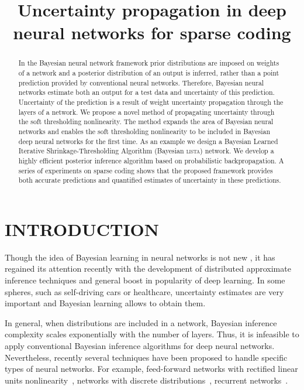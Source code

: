\documentclass[letterpaper]{article}
\title{Uncertainty propagation in deep neural networks for sparse coding}
\author{} %
\begin{document}
\maketitle

\begin{abstract}
In the Bayesian neural network framework prior distributions are imposed on weights of a network and a posterior distribution of an output is inferred, rather than a point prediction provided by conventional neural networks. Therefore, Bayesian neural networks estimate both an output for a test data and uncertainty of this prediction. Uncertainty of the prediction is a result of weight uncertainty propagation through the layers of a network. We propose a novel method of propagating uncertainty through the soft thresholding nonlinearity. The method expands the area of Bayesian neural networks and enables the soft thresholding nonlinearity to be included in Bayesian deep neural networks for the first time. As an example we design a Bayesian Learned Iterative Shrinkage-Thresholding Algorithm (Bayesian \textsc{lista}) network. We develop a highly efficient posterior inference algorithm based on probabilistic backpropagation. A series of experiments on sparse coding shows that the proposed framework provides both accurate predictions and quantified estimates of uncertainty in these predictions.
\end{abstract}

\section{\uppercase{Introduction}}
Though the idea of Bayesian learning in neural networks is not new \citep{neal2012bayesian}, it has regained its attention recently with the development of distributed approximate inference techniques \citep{li2015stochastic, hoffman2013stochastic}  and general boost in popularity of deep learning. In some spheres, such as self-driving cars or healthcare, uncertainty estimates are very important and Bayesian learning allows to obtain them. 

In general, when distributions are included in a network, Bayesian inference complexity scales exponentially with the number of layers. Thus, it is infeasible to apply conventional Bayesian inference algorithms for deep neural networks. Nevertheless, recently several techniques have been proposed to handle specific types of neural networks. For example, feed-forward networks with rectified linear units nonlinearity~\citep{hernandez2015probabilistic}, networks with discrete distributions~\citep{soudry2014expectation}, recurrent networks~\citep{mcdermott2017bayesian}. 
\end{document}
